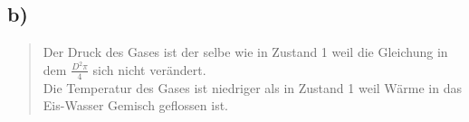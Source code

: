 

\subsection*{b)}

\begin{quote}
Der Druck des Gases ist der selbe wie in Zustand 1 weil die Gleichung in dem \(\frac{D^2 \pi}{4}\) sich nicht verändert. \\
Die Temperatur des Gases ist niedriger als in Zustand 1 weil Wärme in das Eis-Wasser Gemisch geflossen ist.
\end{quote}